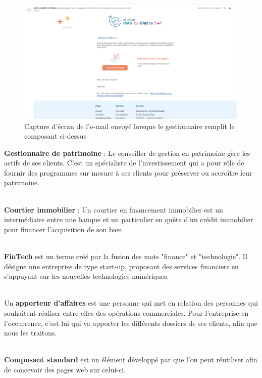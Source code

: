 \documentclass[12pt,oneside,noprintercorrection]{iut}
\begin{document}
\begin{figure}[!ht]
  \centering
  \includegraphics[width=15cm]{img/emailQuickAccount.png}
  \caption{Capture d'écran de l'e-mail envoyé lorsque le gestionnaire remplit le composant ci-dessus}
\end{figure}
\newpage
{}
    \textbf{Gestionnaire de patrimoine} : Le conseiller de gestion en patrimoine gère les actifs de ses clients. C’est un spécialiste de l’investissement qui a pour rôle de fournir des programmes sur mesure à ses clients pour préserver ou accroître leur patrimoine.\newline
    
   ~\\\indent \textbf{Courtier immobilier} : Un courtier en financement immobilier est un intermédiaire entre une banque et un particulier en quête d’un crédit immobilier pour financer l’acquisition de son bien.\newline


    ~\\\indent \textbf{FinTech} est un terme créé par la fusion des mots "finance" et "technologie". Il désigne une entreprise de type start-up, proposant des services financiers en s'appuyant sur les nouvelles technologies numériques. \newline


    ~\\\indent Un \textbf{apporteur d'affaires} est une personne qui met en relation des personnes qui souhaitent réaliser entre elles des opérations commerciales. Pour l'entreprise en l'occurrence, c'est lui qui va apporter les différents dossiers de ses clients, afin que nous les traitons.\newline


    ~\\\indent \textbf{Composant standard} est un élément développé par \slf{} que l'on peut réutiliser afin de concevoir des pages web sur celui-ci.\newline
\end{document}
